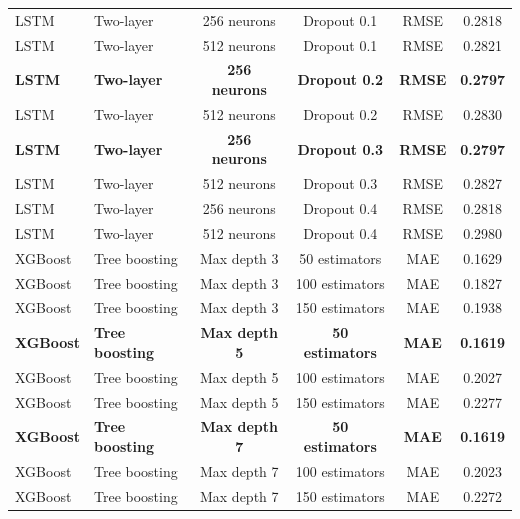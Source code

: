 \begin{landscape}
\begin{longtable}{llcccc}

LSTM & Two-layer & 256 neurons & Dropout 0.1 & RMSE & 0.2818 \\
LSTM & Two-layer & 512 neurons & Dropout 0.1 & RMSE & 0.2821 \\
\textbf{LSTM} & \textbf{Two-layer} & \textbf{256 neurons} & \textbf{Dropout 0.2} & \textbf{RMSE} & \textbf{0.2797} \\
LSTM & Two-layer & 512 neurons & Dropout 0.2 & RMSE & 0.2830 \\
\textbf{LSTM} & \textbf{Two-layer} & \textbf{256 neurons} & \textbf{Dropout 0.3} & \textbf{RMSE} & \textbf{0.2797} \\
LSTM & Two-layer & 512 neurons & Dropout 0.3 & RMSE & 0.2827 \\
LSTM & Two-layer & 256 neurons & Dropout 0.4 & RMSE & 0.2818 \\
LSTM & Two-layer & 512 neurons & Dropout 0.4 & RMSE & 0.2980 \\


XGBoost & Tree boosting & Max depth 3 & 50 estimators  & MAE  & 0.1629 \\
XGBoost & Tree boosting & Max depth 3 & 100 estimators & MAE  & 0.1827 \\
XGBoost & Tree boosting & Max depth 3 & 150 estimators & MAE  & 0.1938 \\
\textbf{XGBoost} & \textbf{Tree boosting} & \textbf{Max depth 5} & \textbf{50 estimators}  & \textbf{MAE}  & \textbf{0.1619} \\
XGBoost & Tree boosting & Max depth 5 & 100 estimators & MAE  & 0.2027 \\
XGBoost & Tree boosting & Max depth 5 & 150 estimators & MAE  & 0.2277 \\
\textbf{XGBoost} & \textbf{Tree boosting} & \textbf{Max depth 7} & \textbf{50 estimators}  & \textbf{MAE}  & \textbf{0.1619} \\
XGBoost & Tree boosting & Max depth 7 & 100 estimators & MAE  & 0.2023 \\
XGBoost & Tree boosting & Max depth 7 & 150 estimators & MAE  & 0.2272 \\



\end{longtable}
\end{landscape}
